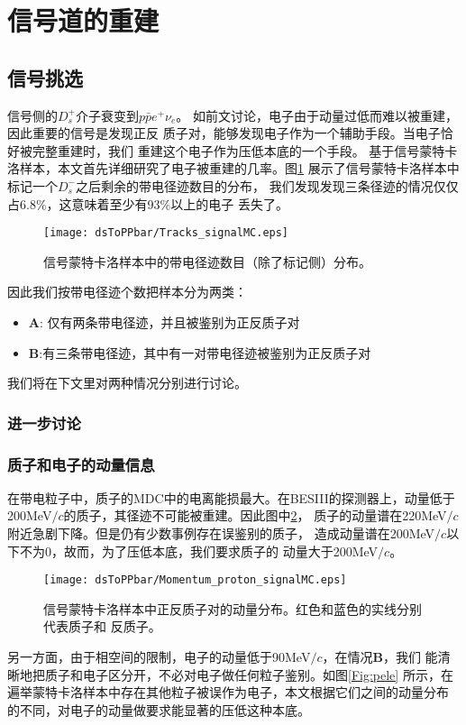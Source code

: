 \section{信号道的重建}\label{Double-Tag}
\subsection{信号挑选}
信号侧的$D_{s}^{+}$介子衰变到$p\bar{p}e^{+}\nu_{e}$。
如前文讨论，电子由于动量过低而难以被重建，因此重要的信号是发现正反
质子对，能够发现电子作为一个辅助手段。当电子恰好被完整重建时，我们
重建这个电子作为压低本底的一个手段。
基于信号蒙特卡洛样本，本文首先详细研究了电子被重建的几率。图\ref{Fig:tracks}
展示了信号蒙特卡洛样本中标记一个$D_{s}^{-}$之后剩余的带电径迹数目的分布，
我们发现发现三条径迹的情况仅仅占6.8\%，这意味着至少有93\%以上的电子
丢失了。
\begin{figure}[htbp]
    \centering
    \texttt{[image: dsToPPbar/Tracks\_signalMC.eps]}
    \caption{信号蒙特卡洛样本中的带电径迹数目（除了标记侧）分布。
    }\label{Fig:tracks}
\end{figure}
因此我们按带电径迹个数把样本分为两类：
\begin{itemize}
    \item \textbf{A}: 仅有两条带电径迹，并且被鉴别为正反质子对
    \item \textbf{B}:有三条带电径迹，其中有一对带电径迹被鉴别为正反质子对
\end{itemize}
我们将在下文里对两种情况分别进行讨论。

\subsubsection{进一步讨论}
\subsubsection{质子和电子的动量信息}
在带电粒子中，质子的MDC中的电离能损最大。在BESIII的探测器上，动量低于
200MeV$/c$的质子，其径迹不可能被重建。因此图中\ref{Fig:momenta_of_proton}，
质子的动量谱在220MeV$/c$附近急剧下降。但是仍有少数事例存在误鉴别的质子，
造成动量谱在200MeV$/c$以下不为0，故而，为了压低本底，我们要求质子的
动量大于200MeV$/c$。
\begin{figure}[htbp]
    \centering
    \texttt{[image: dsToPPbar/Momentum\_proton\_signalMC.eps]}
    \caption{信号蒙特卡洛样本中正反质子对的动量分布。红色和蓝色的实线分别代表质子和
    反质子。
    }\label{Fig:momenta_of_proton}
\end{figure}
另一方面，由于相空间的限制，电子的动量低于90MeV$/c$，在情况\textbf{B}，我们
能清晰地把质子和电子区分开，不必对电子做任何粒子鉴别。如图\ref{Fig:pele}
所示，在遍举蒙特卡洛样本中存在其他粒子被误作为电子，本文根据它们之间的动量分布
的不同，对电子的动量做要求能显著的压低这种本底。

